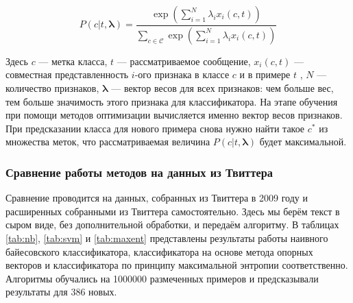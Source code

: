 \begin{equation}
P(c|t,\mathbf{\lambda}) = \frac{\exp\left (\sum\limits_{i=1}^N\lambda_ix_i(c,t)\right )}
{\sum\limits_{c\in\mathcal{C}} \exp\left (\sum\limits_{i=1}^N\lambda_ix_i(c,t)\right )}
\end{equation}

Здесь $c$ --- метка класса, $t$ --- рассматриваемое сообщение, $x_i(c,t)$ --- совместная
представленность $i$-ого признака в классе $c$ и в примере $t$ , $N$ ---
количество признаков, $\mathbf{\lambda}$ --- вектор весов для всех
признаков: чем больше вес, тем больше значимость этого признака для классификатора. На этапе обучения
при помощи методов оптимизации вычисляется именно вектор весов признаков. При предсказании класса
для нового примера снова нужно найти такое $c^*$ из множества меток, что рассматриваемая величина $P(c|t,\mathbf{\lambda})$ будет максимальной.

\subsubsection{Сравнение работы методов на данных из Твиттера}\label{comparemeth}

Сравнение проводится на данных, собранных из Твиттера в 2009 году
\cite{go2009twitter} и расширенных собранными из Твиттера самостоятельно. Здесь мы берём текст в сыром виде, без дополнительной обработки, и передаём
алгоритму. В таблицах \ref{tab:nb}, \ref{tab:svm} и \ref{tab:maxent} представлены результаты работы
наивного байесовского классификатора, классификатора на основе метода опорных векторов и
классификатора по принципу максимальной энтропии соответственно. Алгоритмы обучались на 1000000
размеченных примеров и предсказывали результаты для 386 новых.

